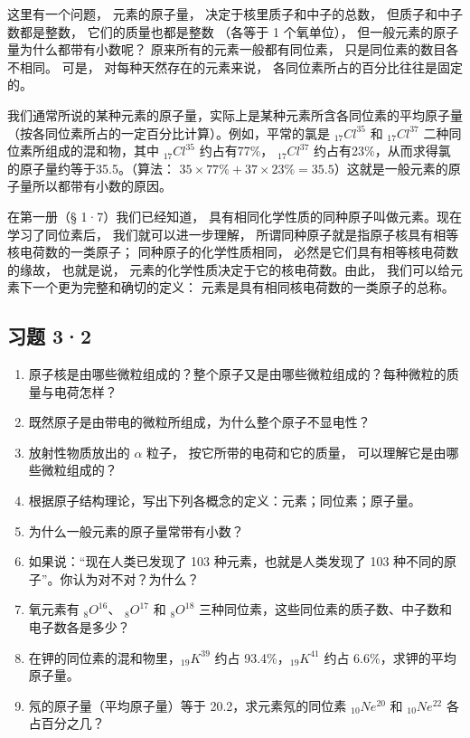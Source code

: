 这里有一个问题， 元素的原子量， 决定于核里质子和中子的总数，
但质子和中子数都是整数， 它们的质量也都是整数 （各等于 1 个氧单位），
但一般元素的原子量为什么都带有小数呢？ 原来所有的元素一般都有同位素，
只是同位素的数目各不相同。 可是， 对每种天然存在的元素来说，
各同位素所占的百分比往往是固定的。

我们通常所说的某种元素的原子量，实际上是某种元素所含各同位素的平均原子量（按各同位素所占的一定百分比计算）。例如，平常的氯是
\(_{17}Cl^{35}\) 和 \(_{17}Cl^{37}\) 二种同位素所组成的混和物，其中
\(_{17}Cl^{35}\) 约占有77\%， \(_{17}Cl^{37}\)
约占有23\%，从而求得氯的原子量约等于35.5。（算法：
\(35\times77\%+37\times23\%=35.5\)）这就是一般元素的原子量所以都带有小数的原因。

在第一册（§ 1·7）我们已经知道，
具有相同化学性质的同种原子叫做元素。现在学习了同位素后，
我们就可以进一步理解，
所谓同种原子就是指原子核具有相等核电荷数的一类原子；
同种原子的化学性质相同， 必然是它们具有相等核电荷数的缘故， 也就是说，
元素的化学性质决定于它的核电荷数。由此，
我们可以给元素下一个更为完整和确切的定义：
元素是具有相同核电荷数的一类原子的总称。

\subsection{习题 3·2}

\begin{enumerate}
\item
  原子核是由哪些微粒组成的？整个原子又是由哪些微粒组成的？每种微粒的质量与电荷怎样？
\item
  既然原子是由带电的微粒所组成，为什么整个原子不显电性？
\item
  放射性物质放出的 \(\alpha\) 粒子， 按它所带的电荷和它的质量，
  可以理解它是由哪些微粒组成的？
\item
  根据原子结构理论，写出下列各概念的定义：元素；同位素；原子量。
\item
  为什么一般元素的原子量常带有小数？
\item
  如果说：``现在人类已发现了 103 种元素，也就是人类发现了 103
  种不同的原子''。你认为对不对？为什么？
\item
  氧元素有 \(_{8}O^{16}\)、 \(_{8}O^{17}\) 和 \(_{8}O^{18}\)
  三种同位素，这些同位素的质子数、中子数和电子数各是多少？
\item
  在钾的同位素的混和物里，\(_{19}K^{39}\) 约占 93.4\%，\(_{19}K^{41}\)
  约占 6.6\%，求钾的平均原子量。
\item
  氖的原子量（平均原子量）等于 20.2，求元素氖的同位素 \(_{10}Ne^{20}\)
  和 \(_{10}Ne^{22}\) 各占百分之几？
\end{enumerate}

